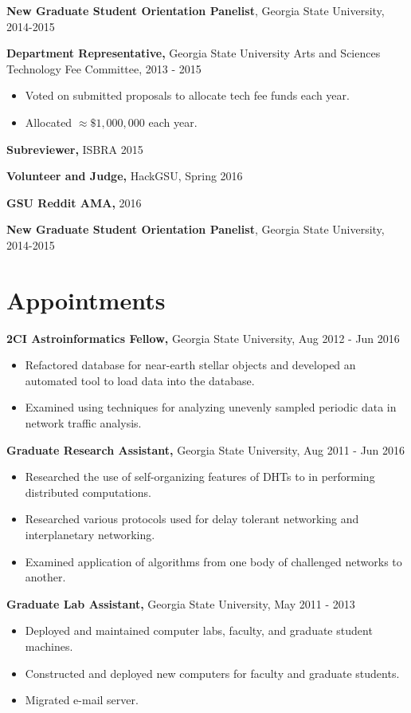\documentclass{res}
\begin{document}
\begin{resume}
{\bf New Graduate Student Orientation Panelist}, Georgia State University, 2014-2015


{\bf Department Representative,} Georgia State University Arts and Sciences Technology Fee Committee, 2013 - 2015
\begin{itemize}
	\item Voted on submitted proposals to allocate tech fee funds each year.
	\item Allocated $\approx \$1,000,000$ each year.
\end{itemize}

{\bf Subreviewer,} ISBRA 2015

{\bf Volunteer and Judge,} HackGSU, Spring 2016

{\bf GSU Reddit AMA,} 2016



{\bf New Graduate Student Orientation Panelist}, Georgia State University, 2014-2015



\section{Appointments}

{\bf 2CI Astroinformatics Fellow,} Georgia State University, Aug 2012 - Jun 2016
     \begin{itemize}
     \item Refactored database for near-earth stellar objects and developed an automated tool to load data into the database.
     \item Examined using techniques for analyzing unevenly sampled periodic data in network traffic analysis.
     \end{itemize}   


{\bf Graduate Research Assistant,} Georgia State University, Aug 2011 - Jun 2016
     \begin{itemize}
     \item Researched the use of self-organizing features of DHTs to in performing distributed computations.
     \item Researched various protocols used for delay tolerant networking and interplanetary networking.
     \item Examined application of algorithms from one body of challenged networks to another.
  
     \end{itemize}   
     
{\bf Graduate Lab Assistant,} Georgia State University, May 2011 - 2013
     \begin{itemize}
     \item Deployed and maintained computer labs, faculty, and graduate student machines.
     \item Constructed and deployed new computers for faculty and graduate students.
     \item Migrated e-mail server.
     \end{itemize}
     


\end{resume}
\end{document}
